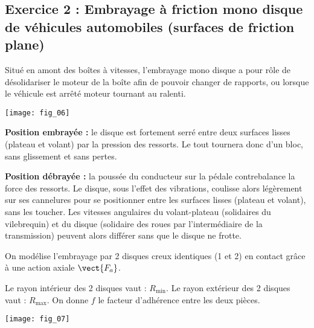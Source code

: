 


\subsection*{Exercice 2 : Embrayage à friction mono disque de véhicules automobiles (surfaces de friction plane)}

Situé en amont des boîtes à vitesses, l'embrayage mono disque a pour rôle de désolidariser le moteur de la 
boîte afin de pouvoir changer de rapports, ou lorsque le véhicule est arrêté moteur tournant au ralenti. 

\begin{marginfigure}
\texttt{[image: fig\_06]}
\end{marginfigure}

\textbf{Position embrayée :} le disque est fortement serré entre deux surfaces lisses (plateau et volant) par la 
pression des ressorts. Le tout tournera donc d'un bloc, sans glissement et sans pertes. 

\textbf{Position débrayée :} la poussée du conducteur sur la pédale contrebalance la force des ressorts. Le disque, sous l'effet des vibrations, coulisse alors légèrement sur ses cannelures pour se positionner entre les surfaces lisses (plateau et volant), sans les toucher. Les vitesses angulaires du volant-plateau (solidaires du vilebrequin) et du disque (solidaire des roues par l'intermédiaire de la transmission) peuvent alors différer 
sans que le disque ne frotte. 


On modélise l'embrayage par 2 disques creux identiques (1 et 2) en contact grâce à une 
action axiale $\vect{F_a}$. 
 
Le rayon intérieur des 2 disques vaut : $R_{\text{min}}$. 
Le rayon extérieur des 2 disques vaut : $R_{\text{max}}$. 
On donne $f$ le facteur d’adhérence entre les deux pièces. 



\begin{marginfigure}
\texttt{[image: fig\_07]}
\end{marginfigure}


